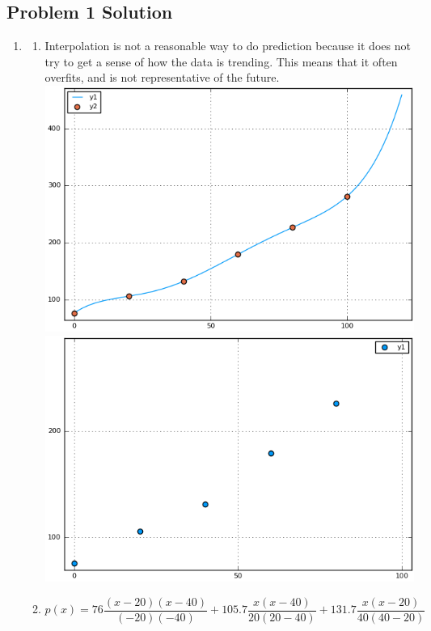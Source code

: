 \documentclass[]{article}
\begin{document}
\subsection{Problem 1 Solution} %
\begin{enumerate}
\def\labelenumi{\arabic{enumi}.}
\item
	\begin{enumerate}
	\item
	Interpolation is not a reasonable way to do prediction because it does not try to get a sense of how the data is trending. This means that it often overfits, and is not representative of the future. 
\hfill \break
\includegraphics[width=\textwidth,keepaspectratio]{Problem1Images/interp.png}
\hfill \break
\includegraphics[width=\textwidth,keepaspectratio]{Problem1Images/scatter.png}
	\item
	\[p(x) = 76 \frac{(x-20)(x-40)}{(-20)(-40)} + 105.7 \frac{x(x-40)}{20(20-40)} + 131.7 \frac{x(x-20)}{40(40-20)} \]

\end{enumerate}
\end{enumerate}
\end{document}
